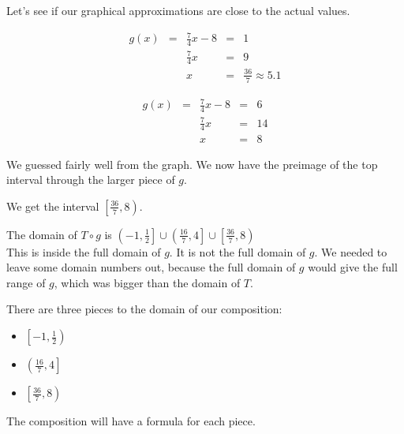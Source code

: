 \documentclass{ximera}
\begin{document}
Let's see if our graphical approximations are close to the actual values.



\begin{align*}
g(x) & = & \frac{7}{4}x - 8  & = & 1 \\
     &   & \frac{7}{4}x      & = & 9  \\
     &   & x                 & = & \frac{36}{7} \approx 5.1
\end{align*}




\begin{align*}
g(x) & = & \frac{7}{4}x - 8  & = & 6 \\
     &   & \frac{7}{4}x      & = & 14  \\
     &   & x                 & = & 8
\end{align*}






We guessed fairly well from the graph.  We now have the preimage of the top interval through the larger piece of $g$.  


We get the interval $\left[ \frac{36}{7}, 8 \right)$.






The domain of $T \circ g$ is $\left( -1, \frac{1}{2} \right] \cup \left( \frac{16}{7}, 4 \right] \cup \left[ \frac{36}{7}, 8 \right)$ \\


This is inside the full domain of $g$. It is not the full domain of $g$.  We needed to leave some domain numbers out, because the full domain of $g$ would give the full range of $g$, which was bigger than the domain of $T$.



There are three pieces to the domain of our composition: 


\begin{itemize}
  \item $\left[ -1, \frac{1}{2} \right)$
  \item $\left( \frac{16}{7}, 4 \right]$
  \item $\left[ \frac{36}{7}, 8 \right)$
\end{itemize}



The composition will have a formula for each piece.
\end{document}
